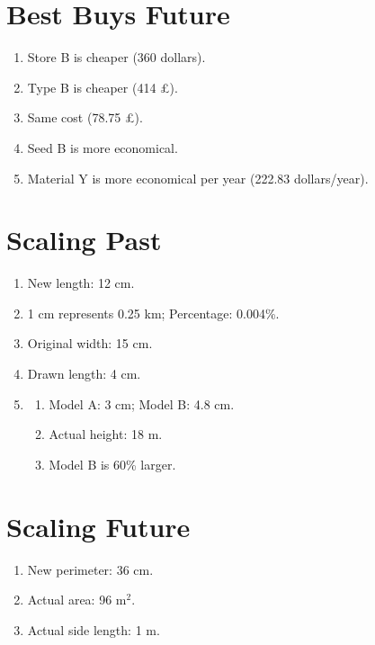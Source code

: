 \documentclass[12pt]{article}
\begin{document}
\section*{Best Buys Future}
\begin{enumerate}[resume]
    \item Store B is cheaper (360 dollars).
    \item Type B is cheaper (414 £).
    \item Same cost (78.75 £).
    \item Seed B is more economical.
    \item Material Y is more economical per year (222.83 dollars/year).
\end{enumerate}

\section*{Scaling Past}
\begin{enumerate}[resume]
    \item New length: 12 cm.
    \item 1 cm represents 0.25 km; Percentage: 0.004\%.
    \item Original width: 15 cm.
    \item Drawn length: 4 cm.
    \item 
    \begin{enumerate}
        \item Model A: 3 cm; Model B: 4.8 cm.
        \item Actual height: 18 m.
        \item Model B is 60\% larger.
    \end{enumerate}
\end{enumerate}

\section*{Scaling Future}
\begin{enumerate}[resume]
    \item New perimeter: 36 cm.
    \item Actual area: 96 m$^2$.
    \item Actual side length: 1 m.
\end{enumerate}
\end{document}
